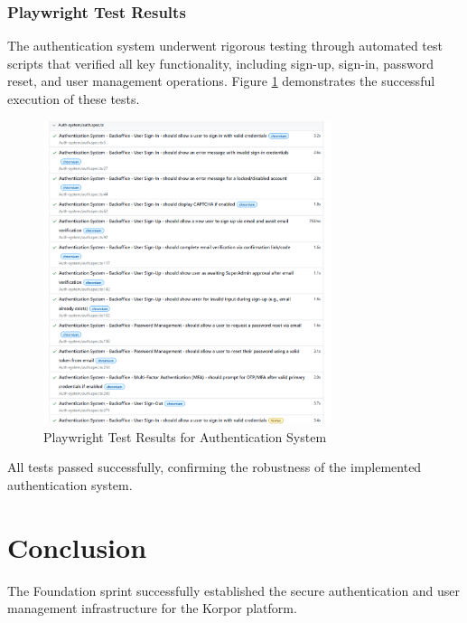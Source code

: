 \subsubsection{Playwright Test Results}
The authentication system underwent rigorous testing through automated test scripts that verified all key functionality, including sign-up, sign-in, password reset, and user management operations. Figure \ref{fig:playwright-tests} demonstrates the successful execution of these tests.
\begin{figure}[htbp]
    \centering
    \includegraphics[width=0.75\textwidth]{images/playwright-test-results.png}
    \caption{Playwright Test Results for Authentication System}
    \label{fig:playwright-tests}
\end{figure}


All tests passed successfully, confirming the robustness of the implemented authentication system.

\section*{Conclusion}

The Foundation sprint successfully established the secure authentication and user management infrastructure for the Korpor platform.

